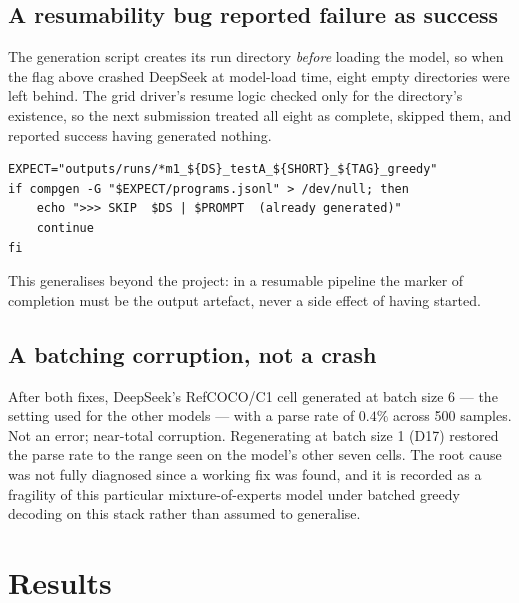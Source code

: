 \subsection{A resumability bug reported failure as success}

The generation script creates its run directory \emph{before} loading the model, so
when the flag above crashed DeepSeek at model-load time, eight empty directories were
left behind. The grid driver's resume logic checked only for the directory's
existence, so the next submission treated all eight as complete, skipped them, and
reported success having generated nothing.

\begin{lstlisting}[caption={Completion is tested by the artefact, not by the
container created to hold it.}]
EXPECT="outputs/runs/*m1_${DS}_testA_${SHORT}_${TAG}_greedy"
if compgen -G "$EXPECT/programs.jsonl" > /dev/null; then
    echo ">>> SKIP  $DS | $PROMPT  (already generated)"
    continue
fi
\end{lstlisting}

This generalises beyond the project: in a resumable pipeline the marker of completion
must be the output artefact, never a side effect of having started.

\subsection{A batching corruption, not a crash}

After both fixes, DeepSeek's RefCOCO/C1 cell generated at batch size 6 --- the setting
used for the other models --- with a parse rate of $0.4\%$ across 500 samples. Not an
error; near-total corruption. Regenerating at batch size 1 (D17) restored the parse
rate to the range seen on the model's other seven cells. The root cause was not fully
diagnosed since a working fix was found, and it is recorded as a fragility of this
particular mixture-of-experts model under batched greedy decoding on this stack rather
than assumed to generalise.

\section{Results}

